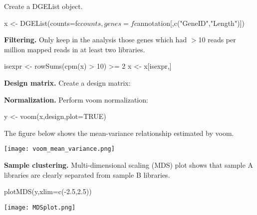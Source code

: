 \documentclass[12pt]{report}
\newcommand{\DGEList}{\textsf{DGEList}}
\newcommand{\voom}{\textsf{voom}}
\begin{document}
Create a {\DGEList} object.
\begin{Rcode}
x <- DGEList(counts=fc$counts, genes=fc$annotation[,c("GeneID","Length")])
\end{Rcode}

%


{\noindent\bf Filtering.} Only keep in the analysis those genes which had $>$10 reads per million mapped reads in at least two libraries.

\begin{Rcode}
isexpr <- rowSums(cpm(x) > 10) >= 2
x <- x[isexpr,]
\end{Rcode}

{\noindent\bf Design matrix.} Create a design matrix: 


{\noindent\bf Normalization.} Perform {\voom} normalization: 

\begin{Rcode}
y <- voom(x,design,plot=TRUE)
\end{Rcode}

The figure below shows the mean-variance relationship estimated by voom.
\begin{center}
\texttt{[image: voom\_mean\_variance.png]}
\end{center}

{\noindent\bf Sample clustering.} Multi-dimensional scaling (MDS) plot shows that sample A libraries are clearly separated from sample B libraries.

\begin{Rcode}
plotMDS(y,xlim=c(-2.5,2.5))
\end{Rcode}

\begin{center}
\texttt{[image: MDSplot.png]}
\end{center}
\end{document}
